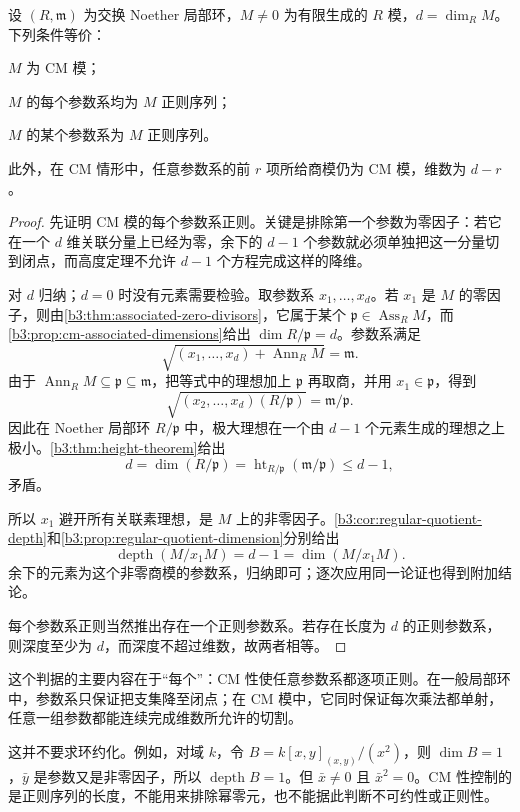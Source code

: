 \begin{theorem}\label{b3:thm:cm-parameters}
	设 \((R,\mathfrak m)\) 为交换 Noether 局部环，\(M\ne0\) 为有限生成的 \(R\) 模，\(d=\dim_RM\)。下列条件等价：
	\begin{equivalences}
		\item \(M\) 为 CM 模；
		\item \(M\) 的每个参数系均为 \(M\) 正则序列；
		\item \(M\) 的某个参数系为 \(M\) 正则序列。
	\end{equivalences}
	此外，在 CM 情形中，任意参数系的前 \(r\) 项所给商模仍为 CM 模，维数为 \(d-r\)。
\end{theorem}
\begin{proof}
	先证明 CM 模的每个参数系正则。关键是排除第一个参数为零因子：若它在一个 \(d\) 维关联分量上已经为零，余下的 \(d-1\) 个参数就必须单独把这一分量切到闭点，而高度定理不允许 \(d-1\) 个方程完成这样的降维。

	对 \(d\) 归纳；\(d=0\) 时没有元素需要检验。取参数系 \(x_1,\ldots,x_d\)。若 \(x_1\) 是 \(M\) 的零因子，则由\cref{b3:thm:associated-zero-divisors}，它属于某个 \(\mathfrak p\in\operatorname{Ass}_RM\)，而\cref{b3:prop:cm-associated-dimensions}给出 \(\dim R/\mathfrak p=d\)。参数系满足
	\[
		\sqrt{(x_1,\ldots,x_d)+\operatorname{Ann}_RM}=\mathfrak m.
	\]
	由于 \(\operatorname{Ann}_RM\subseteq\mathfrak p\subseteq\mathfrak m\)，把等式中的理想加上 \(\mathfrak p\) 再取商，并用 \(x_1\in\mathfrak p\)，得到
	\[
		\sqrt{(x_2,\ldots,x_d)(R/\mathfrak p)} =\mathfrak m/\mathfrak p.
	\]
	因此在 Noether 局部环 \(R/\mathfrak p\) 中，极大理想在一个由 \(d-1\) 个元素生成的理想之上极小。\cref{b3:thm:height-theorem}给出
	\[
		d=\dim(R/\mathfrak p) =\operatorname{ht}_{R/\mathfrak p}(\mathfrak m/\mathfrak p) \le d-1,
	\]
	矛盾。

	所以 \(x_1\) 避开所有关联素理想，是 \(M\) 上的非零因子。\cref{b3:cor:regular-quotient-depth}和\cref{b3:prop:regular-quotient-dimension}分别给出
	\[
		\operatorname{depth}(M/x_1M)=d-1=\dim(M/x_1M).
	\]
	余下的元素为这个非零商模的参数系，归纳即可；逐次应用同一论证也得到附加结论。

	每个参数系正则当然推出存在一个正则参数系。若存在长度为 \(d\) 的正则参数系，则深度至少为 \(d\)，而深度不超过维数，故两者相等。
\end{proof}

这个判据的主要内容在于“每个”：CM 性使任意参数系都逐项正则。在一般局部环中，参数系只保证把支集降至闭点；在 CM 模中，它同时保证每次乘法都单射，任意一组参数都能连续完成维数所允许的切割。

\ProseParagraphBreak
这并不要求环约化。例如，对域 \(k\)，令 \(B=k[x,y]_{(x,y)}/(x^2)\)，则 \(\dim B=1\)，\(\bar y\) 是参数又是非零因子，所以 \(\operatorname{depth}B=1\)。但 \(\bar x\ne0\) 且 \(\bar x^2=0\)。CM 性控制的是正则序列的长度，不能用来排除幂零元，也不能据此判断不可约性或正则性。
